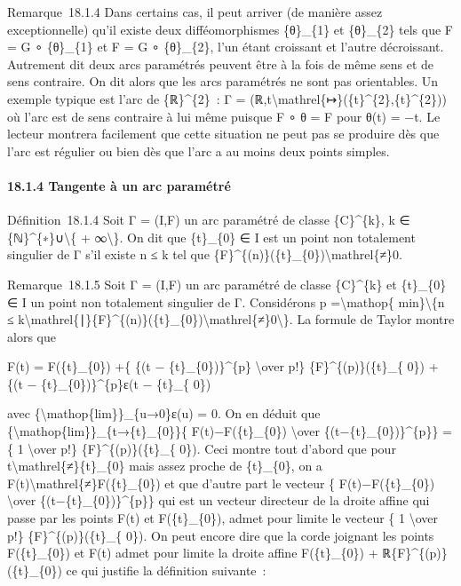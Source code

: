 \documentclass[]{article}
\begin{document}
Remarque~18.1.4 Dans certains cas, il peut arriver (de manière assez
exceptionnelle) qu'il existe deux difféomorphismes \{θ\}\_\{1\} et
\{θ\}\_\{2\} tels que F = G ∘ \{θ\}\_\{1\} et F = G ∘ \{θ\}\_\{2\}, l'un
étant croissant et l'autre décroissant. Autrement dit deux arcs
paramétrés peuvent être à la fois de même sens et de sens contraire. On
dit alors que les arcs paramétrés ne sont pas orientables. Un exemple
typique est l'arc de \{ℝ\}\^{}\{2\}~: Γ =
(ℝ,t\textbackslash{}mathrel\{↦\}(\{t\}\^{}\{2\},\{t\}\^{}\{2\})) où
l'arc est de sens contraire à lui même puisque F ∘ θ = F pour θ(t) = −t.
Le lecteur montrera facilement que cette situation ne peut pas se
produire dès que l'arc est régulier ou bien dès que l'arc a au moins
deux points simples.

\paragraph{18.1.4 Tangente à un arc paramétré}

Définition~18.1.4 Soit Γ = (I,F) un arc paramétré de classe
\{C\}\^{}\{k\}, k ∈ \{ℕ\}\^{}\{∗\}∪\textbackslash{}\{ +
∞\textbackslash{}\}. On dit que \{t\}\_\{0\} ∈ I est un point non
totalement singulier de Γ s'il existe n ≤ k tel que
\{F\}\^{}\{(n)\}(\{t\}\_\{0\})\textbackslash{}mathrel\{≠\}0.

Remarque~18.1.5 Soit Γ = (I,F) un arc paramétré de classe \{C\}\^{}\{k\}
et \{t\}\_\{0\} ∈ I un point non totalement singulier de Γ. Considérons
p =\textbackslash{}mathop\{ min\}\textbackslash{}\{n ≤
k\textbackslash{}mathrel\{∣\}\{F\}\^{}\{(n)\}(\{t\}\_\{0\})\textbackslash{}mathrel\{≠\}0\textbackslash{}\}.
La formule de Taylor montre alors que

F(t) = F(\{t\}\_\{0\}) +\{ \{(t − \{t\}\_\{0\})\}\^{}\{p\}
\textbackslash{}over p!\} \{F\}\^{}\{(p)\}(\{t\}\_\{ 0\}) + \{(t −
\{t\}\_\{0\})\}\^{}\{p\}ε(t − \{t\}\_\{ 0\})

avec \{\textbackslash{}mathop\{lim\}\}\_\{u→0\}ε(u) = 0. On en déduit
que \{\textbackslash{}mathop\{lim\}\}\_\{t→\{t\}\_\{0\}\}\{
F(t)−F(\{t\}\_\{0\}) \textbackslash{}over
\{(t−\{t\}\_\{0\})\}\^{}\{p\}\} =\{ 1 \textbackslash{}over p!\}
\{F\}\^{}\{(p)\}(\{t\}\_\{ 0\}). Ceci montre tout d'abord que pour
t\textbackslash{}mathrel\{≠\}\{t\}\_\{0\} mais assez proche de
\{t\}\_\{0\}, on a F(t)\textbackslash{}mathrel\{≠\}F(\{t\}\_\{0\}) et
que d'autre part le vecteur \{ F(t)−F(\{t\}\_\{0\}) \textbackslash{}over
\{(t−\{t\}\_\{0\})\}\^{}\{p\}\} qui est un vecteur directeur de la
droite affine qui passe par les points F(t) et F(\{t\}\_\{0\}), admet
pour limite le vecteur \{ 1 \textbackslash{}over p!\}
\{F\}\^{}\{(p)\}(\{t\}\_\{ 0\}). On peut encore dire que la corde
joignant les points F(\{t\}\_\{0\}) et F(t) admet pour limite la droite
affine F(\{t\}\_\{0\}) + ℝ\{F\}\^{}\{(p)\}(\{t\}\_\{0\}) ce qui justifie
la définition suivante~:
\end{document}
